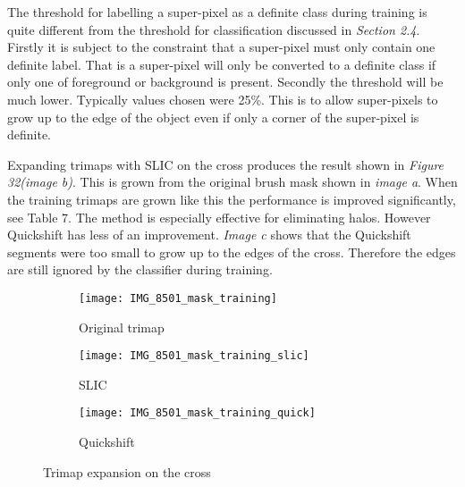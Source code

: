 \documentclass[12pt]{IIBproject}
\begin{document}
The threshold for labelling a super-pixel as a definite class during training is quite different from the threshold for classification discussed in \emph{Section 2.4}. Firstly it is subject to the constraint that a super-pixel must only contain one definite label. That is a super-pixel will only be converted to a definite class if only one of foreground or background is present. Secondly the threshold will be much lower. Typically values chosen were 25\%. This is to allow super-pixels to grow up to the edge of the object even if only a corner of the super-pixel is definite.

Expanding trimaps with SLIC on the cross produces the result shown in \emph{Figure 32(image b)}. This is grown from the original brush mask shown in \emph{image a}. When the training trimaps are grown like this the performance is improved significantly, see Table 7. The method is especially effective for eliminating halos. However Quickshift has less of an improvement. \emph{Image c} shows that the Quickshift segments were too small to grow up to the edges of the cross. Therefore the edges are still ignored by the classifier during training.
\begin{figure}[H]
\centering
\begin{subfigure}{.45\textwidth}
  \centering
  \texttt{[image: IMG\_8501\_mask\_training]}
  \caption{Original trimap}
  \label{fig:sub1}
\end{subfigure}%
\begin{subfigure}{.45\textwidth}
  \centering
  \texttt{[image: IMG\_8501\_mask\_training\_slic]}
  \caption{SLIC}
  \label{fig:sub2}
\end{subfigure}
\begin{subfigure}{.45\textwidth}
  \centering
  \texttt{[image: IMG\_8501\_mask\_training\_quick]}
  \caption{Quickshift}
  \label{fig:sub2}
\end{subfigure}

\caption{Trimap expansion on the cross}
\label{fig:test}
\end{figure}
\end{document}
